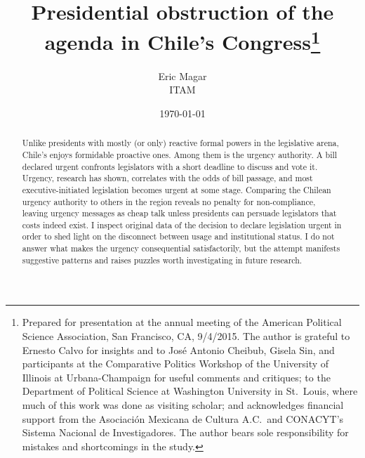 \documentclass[letter,12pt]{article}
\begin{document}
\title{Presidential obstruction of the \\agenda in Chile's Congress\thanks{Prepared for presentation at the annual meeting of the American Political Science Association, San Francisco, CA, 9/4/2015. The author is grateful to Ernesto Calvo for insights and to Jos\'e Antonio Cheibub, Gisela Sin, and participants at the Comparative Politics Workshop of the University of Illinois at Urbana-Champaign for useful comments and critiques; to the Department of Political Science at Washington University in St.\ Louis, where much of this work was done as visiting scholar; and acknowledges financial support from the Asociaci\'on Mexicana de Cultura A.C.\ and CONACYT's Sistema Nacional de Investigadores. The author bears sole responsibility for mistakes and shortcomings in the study.}}
\author{Eric Magar \\ ITAM }
\date{\today}
\maketitle


\begin{abstract}
\noindent Unlike presidents with mostly (or only) reactive formal powers in the legislative arena, Chile's enjoys formidable proactive ones. Among them is the urgency authority. A bill declared urgent confronts legislators with a short deadline to discuss and vote it. Urgency, research has shown, correlates with the odds of bill passage, and most executive-initiated legislation becomes urgent at some stage. Comparing the Chilean urgency authority to others in the region reveals no penalty for non-compliance, leaving urgency messages as cheap talk unless presidents can persuade legislators that costs indeed exist. I inspect original data of the decision to declare legislation urgent in order to shed light on the disconnect between usage and institutional status. I do not answer what makes the urgency consequential satisfactorily, but the attempt manifests suggestive patterns and raises puzzles worth investigating in future research. 
\end{abstract}

\end{document}
